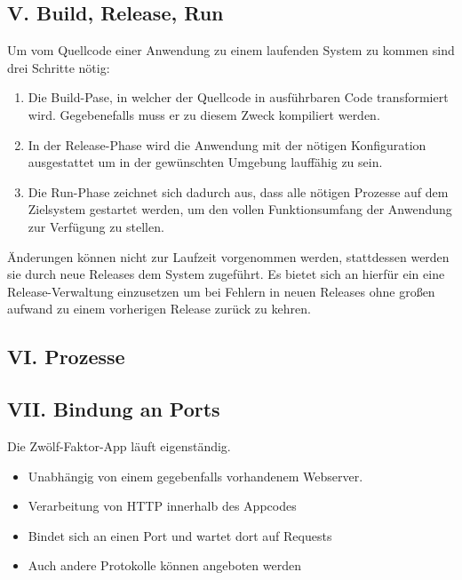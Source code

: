 \documentclass[fleqn,10pt]{SelfArx} %
\begin{document}
\subsection{V. Build, Release, Run}
Um vom Quellcode einer Anwendung zu einem laufenden System zu kommen sind drei Schritte nötig:
\begin{enumerate}
	\item Die Build-Pase, in welcher der Quellcode in ausführbaren Code transformiert wird. Gegebenefalls muss er zu diesem Zweck kompiliert werden.
	\item In der Release-Phase wird die Anwendung mit der nötigen Konfiguration ausgestattet um in der gewünschten Umgebung lauffähig zu sein.
	\item Die Run-Phase zeichnet sich dadurch aus, dass alle nötigen Prozesse auf dem Zielsystem gestartet werden, um den vollen Funktionsumfang der Anwendung zur Verfügung zu stellen.
\end{enumerate}
Änderungen können nicht zur Laufzeit vorgenommen werden, stattdessen werden sie durch neue Releases dem System zugeführt. Es bietet sich an hierfür ein eine Release-Verwaltung einzusetzen um bei Fehlern in neuen Releases ohne großen aufwand zu einem vorherigen Release zurück zu kehren.
\subsection{VI. Prozesse}

\subsection{VII. Bindung an Ports}
Die Zwölf-Faktor-App läuft eigenständig.
\begin{itemize}
	\item Unabhängig von einem gegebenfalls vor\-han\-den\-em Web\-server.
	\item Verarbeitung von HTTP innerhalb des Appcodes
	\item Bindet sich an einen Port und wartet dort auf Requests
	\item Auch andere Protokolle können angeboten werden
\end{itemize}
\end{document}
